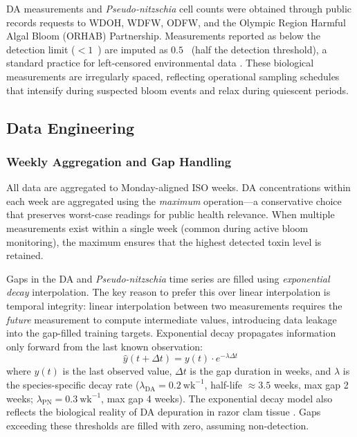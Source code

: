 \documentclass[toxins,article,submit,moreauthors]{Definitions/mdpi}
\begin{document}
DA measurements and \textit{Pseudo-nitzschia} cell counts were obtained through public records requests to WDOH, WDFW, ODFW, and the Olympic Region Harmful Algal Bloom (ORHAB) Partnership. Measurements reported as below the detection limit ($< 1$~\si{\microgrampeg}) are imputed as $0.5$~\si{\microgrampeg} (half the detection threshold), a standard practice for left-censored environmental data \cite{Helsel2012}. These biological measurements are irregularly spaced, reflecting operational sampling schedules that intensify during suspected bloom events and relax during quiescent periods.

\subsection{Data Engineering}
\label{sec:data-engineering}

\subsubsection{Weekly Aggregation and Gap Handling}

All data are aggregated to Monday-aligned ISO weeks. DA concentrations within each week are aggregated using the \textit{maximum} operation---a conservative choice that preserves worst-case readings for public health relevance. When multiple measurements exist within a single week (common during active bloom monitoring), the maximum ensures that the highest detected toxin level is retained.

Gaps in the DA and \textit{Pseudo-nitzschia} time series are filled using \textit{exponential decay} interpolation. The key reason to prefer this over linear interpolation is temporal integrity: linear interpolation between two measurements requires the \textit{future} measurement to compute intermediate values, introducing data leakage into the gap-filled training targets. Exponential decay propagates information only forward from the last known observation:
\begin{equation}
\hat{y}(t + \Delta t) = y(t) \cdot e^{-\lambda \Delta t}
\label{eq:decay}
\end{equation}
where $y(t)$ is the last observed value, $\Delta t$ is the gap duration in weeks, and $\lambda$ is the species-specific decay rate ($\lambda_{\text{DA}} = 0.2~\text{wk}^{-1}$, half-life $\approx 3.5$ weeks, max gap 2 weeks; $\lambda_{\text{PN}} = 0.3~\text{wk}^{-1}$, max gap 4 weeks). The exponential decay model also reflects the biological reality of DA depuration in razor clam tissue \cite{Drum1993, Wekell1994}. Gaps exceeding these thresholds are filled with zero, assuming non-detection.
\end{document}
